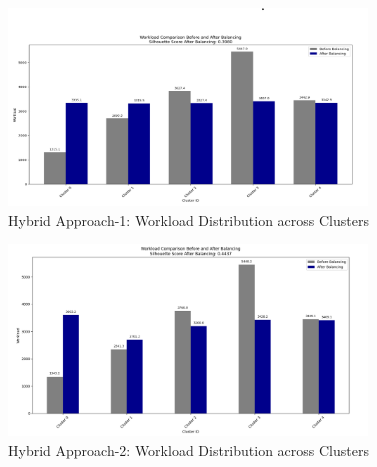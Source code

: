 \begin{table}[H]
    \centering
    \caption{Silhouette Score Comparison for Different Clustering Algorithms}
    \label{tab:silhouette_scores}
    \end{table}

    \begin{figure}[H]
        \centering
        \includegraphics[width=0.85\textwidth]{images/results_hybrid1.png}
        \caption{Hybrid Approach-1: Workload Distribution across Clusters}
        \label{fig:hybrid1_workload}
    \end{figure}
    
    \begin{figure}[H]
        \centering
        \includegraphics[width=0.85\textwidth]{images/results_hybrid2.png}
        \caption{Hybrid Approach-2: Workload Distribution across Clusters}
        \label{fig:hybrid2_workload}
    \end{figure}

